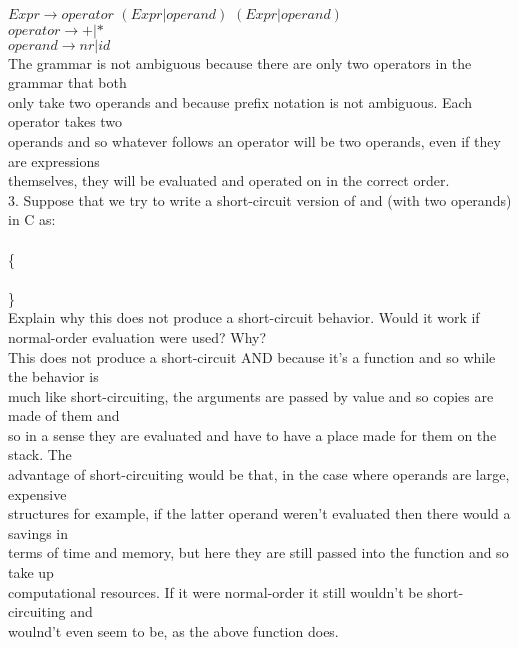 \documentclass[12pt]{article}
\begin{document}
\begin{flushleft}
\qquad $Expr \rightarrow operator$ $(Expr|operand)$ $(Expr|operand)$\\
\qquad $operator \rightarrow +|*$\\
\qquad $operand \rightarrow nr|id$\\
[2mm]

\qquad The grammar is not ambiguous because there are only two operators in the grammar that both\\
\qquad only take two operands and because prefix notation is not ambiguous.  Each operator takes two\\
\qquad operands and so whatever follows an operator will be two operands, even if they are expressions\\
\qquad themselves, they will be evaluated and operated on in the correct order.\\
[6mm]

3. Suppose that we try to write a short-circuit version of and (with two operands) in C
as:\\
[2mm]
\\
\qquad \{\\
\\
\qquad \}\\
[2mm]

Explain why this does not produce a short-circuit behavior. Would it work if normal-order
evaluation were used? Why?\\
[2mm]

\qquad This does not produce a short-circuit AND because it's a function and so while the behavior is\\
\qquad much like short-circuiting, the arguments are passed by value and so copies are made of them and\\
\qquad so in a sense they are evaluated and have to have a place made for them on the stack.  The\\
\qquad advantage of short-circuiting would be that, in the case where operands are large, expensive\\
\qquad structures for example, if the latter operand weren't evaluated then there would a savings in\\
\qquad terms of time and memory, but here they are still passed into the function and so take up\\
\qquad computational resources.  If it were normal-order it still wouldn't be short-circuiting and\\
\qquad woulnd't even seem to be, as the above function does.\\ 
[20mm]


\end{flushleft}
\end{document}
